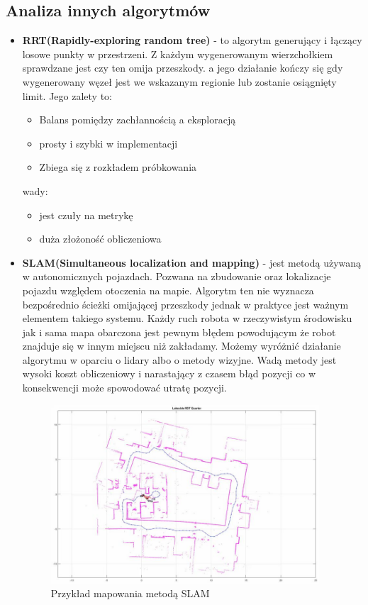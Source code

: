 \subsection{Analiza innych algorytmów}
\begin{itemize}
	\item{ \textbf{RRT(Rapidly-exploring random tree)}\cite{RRTLec} - to algorytm generujący i łączący 
	losowe punkty w przestrzeni. Z każdym wygenerowanym wierzchołkiem sprawdzane jest czy ten omija przeszkody.
	a jego działanie kończy się gdy wygenerowany węzeł jest we wskazanym regionie lub zostanie osiągnięty limit.
	Jego zalety to:
		\begin{itemize}
			\item Balans pomiędzy zachłannością a eksploracją
			\item prosty i szybki w implementacji
			\item Zbiega się z rozkładem próbkowania
		\end{itemize}
	wady:
		\begin{itemize}
			\item jest czuły na metrykę
			\item duża złożoność obliczeniowa
		\end{itemize}
	}
	\item{\textbf{SLAM(Simultaneous localization and mapping)} \cite{SLAMMat} - jest metodą używaną w autonomicznych 
	pojazdach. Pozwana na zbudowanie oraz lokalizacje pojazdu względem otoczenia na mapie. Algorytm ten nie wyznacza bezpośrednio
	ścieżki omijającej przeszkody jednak w praktyce jest ważnym elementem takiego systemu. Każdy ruch robota w rzeczywistym 
	środowisku jak i sama mapa obarczona jest pewnym błędem powodującym że robot znajduje się w innym miejscu niż zakładamy. 
	Możemy wyróżnić działanie algorytmu w oparciu o lidary albo o metody wizyjne. Wadą metody jest wysoki koszt obliczeniowy 
	i narastający z czasem błąd pozycji co w konsekwencji może spowodować utratę pozycji.
	\begin{figure}[H]
		\centering
		\includegraphics[width=10cm]{pages/algorytm/zdjecia/slam.jpg}
		\caption{Przykład mapowania metodą SLAM\cite{SLAMMat}}
	\end{figure}
	}
\end{itemize}
